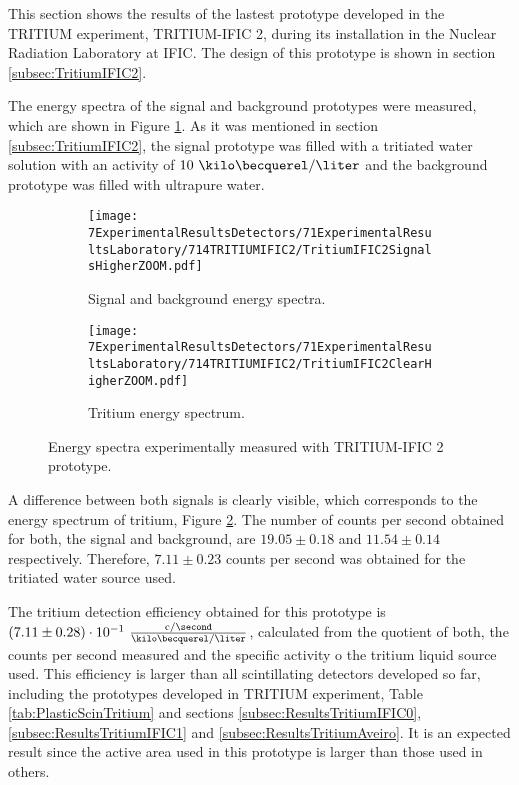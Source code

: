 This section shows the results of the lastest prototype developed in the TRITIUM experiment, TRITIUM-IFIC 2, during its installation in the Nuclear Radiation Laboratory at IFIC. The design of this prototype is shown in section \ref{subsec:TritiumIFIC2}.

The energy spectra of the signal and background prototypes were measured, which are shown in Figure \ref{subfig:SignalBackgroundEnergySpectraTritiumIFIC2}. As it was mentioned in section \ref{subsec:TritiumIFIC2}, the signal prototype was filled with a tritiated water solution with an activity of $10~\kilo\becquerel/\liter$ and the background prototype was filled with ultrapure water.

\begin{figure}
\centering
    \begin{subfigure}[b]{0.73\textwidth}
    \centering
    \texttt{[image: 7ExperimentalResultsDetectors/71ExperimentalResultsLaboratory/714TRITIUMIFIC2/TritiumIFIC2SignalsHigherZOOM.pdf]}  
    \caption{Signal and background energy spectra.\label{subfig:SignalBackgroundEnergySpectraTritiumIFIC2}}
    \end{subfigure}
    \hfill
    \begin{subfigure}[b]{0.73\textwidth}
    \centering
    \texttt{[image: 7ExperimentalResultsDetectors/71ExperimentalResultsLaboratory/714TRITIUMIFIC2/TritiumIFIC2ClearHigherZOOM.pdf]}  
    \caption{Tritium energy spectrum.\label{subfig:TritiumEnergySpectraTritiumIFIC2}}
    \end{subfigure}
 \caption{Energy spectra experimentally measured with TRITIUM-IFIC 2 prototype.}
 \label{fig:EnergySpectraTRITIUMIFIC2}
\end{figure}

A difference between both signals is clearly visible, which corresponds to the energy spectrum of tritium, Figure \ref{subfig:TritiumEnergySpectraTritiumIFIC2}. The number of counts per second obtained for both, the signal and background, are $19.05 \pm 0.18$ and $11.54 \pm 0.14$ respectively. Therefore, $7.11 \pm 0.23$ counts per second was obtained for the tritiated water source used.

The tritium detection efficiency obtained for this prototype is $(7.11 \pm 0.28)\cdot{} 10^{-1}~ \frac{\text{c}/\second}{\kilo\becquerel/\liter}$, calculated from the quotient of both, the counts per second measured and the specific activity o the tritium liquid source used. This efficiency is larger than all scintillating detectors developed so far, including the prototypes developed in TRITIUM experiment, Table \ref{tab:PlasticScinTritium} and sections \ref{subsec:ResultsTritiumIFIC0}, \ref{subsec:ResultsTritiumIFIC1} and \ref{subsec:ResultsTritiumAveiro}. It is an expected result since the active area used in this prototype is larger than those used in others.

